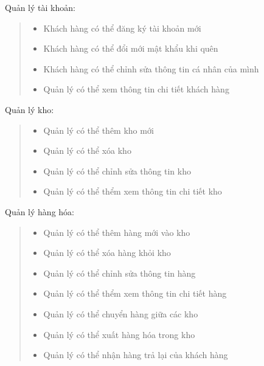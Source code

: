         Quản lý tài khoản:
        \begin{quote}
            \begin{itemize}
                \item Khách hàng có thể đăng ký tài khoản mới
                \item Khách hàng có thể đổi mới mật khẩu khi quên
                \item Khách hàng có thể chỉnh sửa thông tin cá nhân của mình
                \item Quản lý có thể xem thông tin chi tiết khách hàng
            \end{itemize}
        \end{quote}
    
        Quản lý kho:
        \begin{quote}
            \begin{itemize}
                \item Quản lý có thể thêm kho mới
                \item Quản lý có thể xóa kho
                \item Quản lý có thể chỉnh sửa thông tin kho
                \item Quản lý có thể thểm xem thông tin chi tiết kho
            \end{itemize}
        \end{quote}
        
        Quản lý hàng hóa:
        \begin{quote}
            \begin{itemize}
                \item Quản lý có thể thêm hàng mới vào kho
                \item Quản lý có thể xóa hàng khỏi kho
                \item Quản lý có thể chỉnh sửa thông tin hàng
                \item Quản lý có thể thểm xem thông tin chi tiết hàng
                \item Quản lý có thể chuyển hàng giữa các kho
                \item Quản lý có thể xuất hàng hóa trong kho
                \item Quản lý có thể nhận hàng trả lại của khách hàng
            \end{itemize}
        \end{quote}
        
